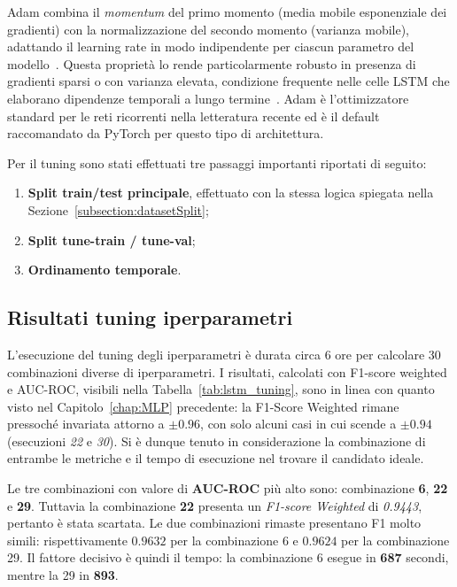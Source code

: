 \documentclass[../main.tex]{subfiles}
\begin{document}
Adam combina il \textit{momentum} del primo momento (media mobile esponenziale dei gradienti) con la normalizzazione del secondo momento (varianza mobile), adattando il learning rate in modo indipendente per ciascun parametro del modello~\cite{kingma2017adammethodstochasticoptimization}. Questa proprietà lo rende particolarmente robusto in presenza di gradienti sparsi o con varianza elevata, condizione frequente nelle celle LSTM che elaborano dipendenze temporali a lungo termine~\cite{ALSELWI2024102068}. Adam è l'ottimizzatore standard per le reti ricorrenti nella letteratura recente ed è il default raccomandato da PyTorch per questo tipo di architettura.

Per il tuning sono stati effettuati tre passaggi importanti riportati di seguito:
\begin{enumerate}
    \item \textbf{Split train/test principale}, effettuato con la stessa logica spiegata nella Sezione~\ref{subsection:datasetSplit};
    \item \textbf{Split tune-train / tune-val};
    \item \textbf{Ordinamento temporale}.
\end{enumerate}

\subsection{Risultati tuning iperparametri}
L'esecuzione del tuning degli iperparametri è durata circa 6 ore per calcolare 30 combinazioni diverse di iperparametri.
I risultati, calcolati con F1-score weighted e AUC-ROC, visibili nella Tabella~\ref{tab:lstm_tuning}, sono in linea con quanto visto nel Capitolo~\ref{chap:MLP} precedente: la F1-Score Weighted rimane pressoché invariata attorno a $\pm 0.96$, con solo alcuni casi in cui scende a $\pm 0.94$ (esecuzioni \textit{22} e \textit{30}). Si è dunque tenuto in considerazione la combinazione di entrambe le metriche e il tempo di esecuzione nel trovare il candidato ideale.

Le tre combinazioni con valore di \textbf{AUC-ROC} più alto sono: combinazione \textbf{6}, \textbf{22} e \textbf{29}. Tuttavia la combinazione \textbf{22} presenta un \textit{F1-score Weighted} di \textit{0.9443}, pertanto è stata scartata. Le due combinazioni rimaste presentano F1 molto simili: rispettivamente $0.9632$ per la combinazione 6 e $0.9624$ per la combinazione 29.
Il fattore decisivo è quindi il tempo: la combinazione 6 esegue in \textbf{687} secondi, mentre la 29 in \textbf{893}.
\end{document}
